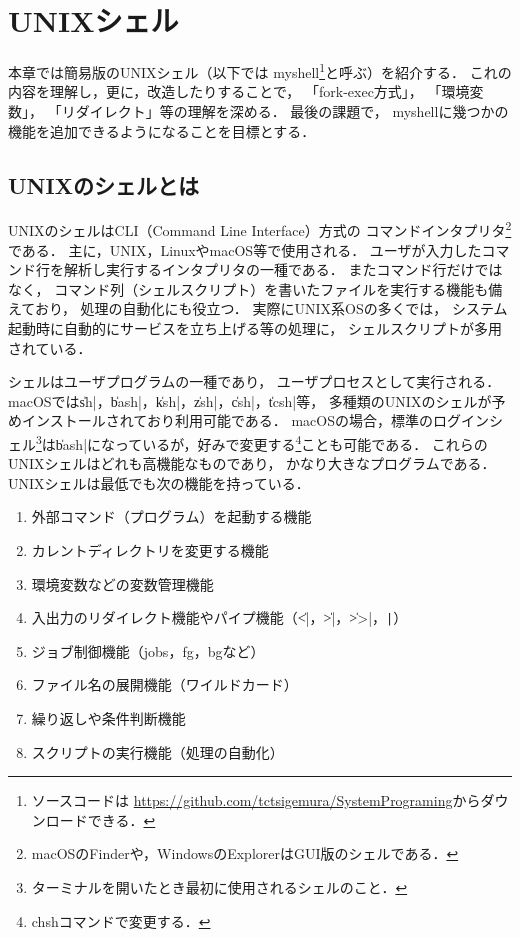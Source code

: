 \chapter{UNIXシェル}
本章では簡易版のUNIXシェル（以下では myshell\footnote{
ソースコードは
\url{https://github.com/tctsigemura/SystemPrograming}からダウンロードできる．
}と呼ぶ）を紹介する．
これの内容を理解し，更に，改造したりすることで，
「fork-exec方式」，
「環境変数」，
「リダイレクト」等の理解を深める．
最後の課題で，
myshellに幾つかの機能を追加できるようになることを目標とする．

\section{UNIXのシェルとは}
UNIXのシェルはCLI（Command Line Interface）方式の
コマンドインタプリタ\footnote{
macOSのFinderや，WindowsのExplorerはGUI版のシェルである．}である．
主に，UNIX，LinuxやmacOS等で使用される．
ユーザが入力したコマンド行を解析し実行するインタプリタの一種である．
またコマンド行だけではなく，
コマンド列（シェルスクリプト）を書いたファイルを実行する機能も備えており，
処理の自動化にも役立つ．
実際にUNIX系OSの多くでは，
システム起動時に自動的にサービスを立ち上げる等の処理に，
シェルスクリプトが多用されている．

シェルはユーザプログラムの一種であり，
ユーザプロセスとして実行される．
macOSでは\|sh|，\|bash|，\|ksh|，\|zsh|，\|csh|，\|tcsh|等，
多種類のUNIXのシェルが予めインストールされており利用可能である．
macOSの場合，標準のログインシェル\footnote{
ターミナルを開いたとき最初に使用されるシェルのこと．
}は\|bash|になっているが，好みで変更する\footnote{
chshコマンドで変更する．}ことも可能である．
これらのUNIXシェルはどれも高機能なものであり，
かなり大きなプログラムである．
UNIXシェルは最低でも次の機能を持っている．

\begin{enumerate}
\item 外部コマンド（プログラム）を起動する機能
\item カレントディレクトリを変更する機能
\item 環境変数などの変数管理機能
\item 入出力のリダイレクト機能やパイプ機能（\|<|，\|>|，\|>>|，\verb;|;）
\item ジョブ制御機能（jobs，fg，bgなど）
\item ファイル名の展開機能（ワイルドカード）
\item 繰り返しや条件判断機能
\item スクリプトの実行機能（処理の自動化）
\end{enumerate}

